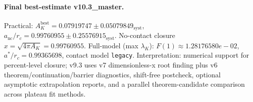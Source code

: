 \paragraph{Final best-estimate v10.3_master.}
Practical: $A_K^{\mathrm{best}} = 0.07919747 \pm 0.05079849_{\mathrm{syst}}$, $a_{\mathrm{nc}}/r_c = 0.99760955 \pm 0.25576915_{\mathrm{syst}}$.
No-contact closure $x = \sqrt{4\pi A_K} = 0.99760955$.
Full-model (max $\lambda_K$): $F(1) \approx 1.28176580e-02$, $a^*/r_c = 0.99365698$, contact model \texttt{legacy}.
Interpretation: numerical support for percent-level closure; v9.3 uses v7 dimensionless-x root finding plus v6 theorem/continuation/barrier diagnostics, shift-free postcheck, optional asymptotic extrapolation reports, and a parallel theorem-candidate comparison across plateau fit methods.
